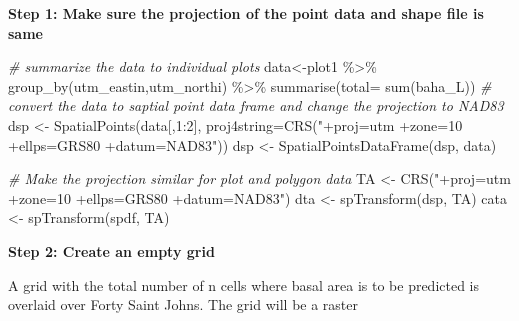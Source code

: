 \documentclass[
]{book}
\newenvironment{Shaded}{\begin{snugshade}}{\end{snugshade}}
\newcommand{\AttributeTok}[1]{\textcolor[rgb]{0.77,0.63,0.00}{#1}}
\newcommand{\CommentTok}[1]{\textcolor[rgb]{0.56,0.35,0.01}{\textit{#1}}}
\newcommand{\DecValTok}[1]{\textcolor[rgb]{0.00,0.00,0.81}{#1}}
\newcommand{\FunctionTok}[1]{\textcolor[rgb]{0.00,0.00,0.00}{#1}}
\newcommand{\NormalTok}[1]{#1}
\newcommand{\OtherTok}[1]{\textcolor[rgb]{0.56,0.35,0.01}{#1}}
\newcommand{\SpecialCharTok}[1]{\textcolor[rgb]{0.00,0.00,0.00}{#1}}
\newcommand{\StringTok}[1]{\textcolor[rgb]{0.31,0.60,0.02}{#1}}
\begin{document}
\textbf{Step 1: Make sure the projection of the point data and shape file is same}

\begin{Shaded}
\begin{Highlighting}[]
\CommentTok{\# summarize the data to individual plots}
\NormalTok{data}\OtherTok{\textless{}{-}}\NormalTok{plot1 }\SpecialCharTok{\%\textgreater{}\%} 
  \FunctionTok{group\_by}\NormalTok{(utm\_eastin,utm\_northi) }\SpecialCharTok{\%\textgreater{}\%}
  \FunctionTok{summarise}\NormalTok{(}\AttributeTok{total=} \FunctionTok{sum}\NormalTok{(baha\_L))}
\CommentTok{\# convert the data to saptial point data frame and change the projection to NAD83}
\NormalTok{dsp }\OtherTok{\textless{}{-}} \FunctionTok{SpatialPoints}\NormalTok{(data[,}\DecValTok{1}\SpecialCharTok{:}\DecValTok{2}\NormalTok{], }\AttributeTok{proj4string=}\FunctionTok{CRS}\NormalTok{(}\StringTok{"+proj=utm +zone=10 +ellps=GRS80 +datum=NAD83"}\NormalTok{))}
\NormalTok{dsp }\OtherTok{\textless{}{-}} \FunctionTok{SpatialPointsDataFrame}\NormalTok{(dsp, data)}

\CommentTok{\# Make the projection similar for plot and polygon data}
\NormalTok{TA }\OtherTok{\textless{}{-}} \FunctionTok{CRS}\NormalTok{(}\StringTok{"+proj=utm +zone=10 +ellps=GRS80 +datum=NAD83"}\NormalTok{)}
\NormalTok{dta }\OtherTok{\textless{}{-}} \FunctionTok{spTransform}\NormalTok{(dsp, TA)}
\NormalTok{cata }\OtherTok{\textless{}{-}} \FunctionTok{spTransform}\NormalTok{(spdf, TA)}
\end{Highlighting}
\end{Shaded}

\textbf{Step 2: Create an empty grid}

A grid with the total number of n cells where basal area is to be predicted is overlaid over Forty Saint Johns. The grid will be a raster
\end{document}
